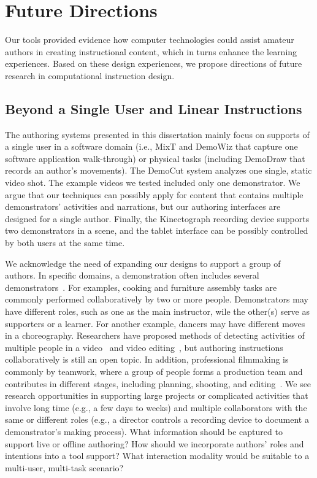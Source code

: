 \section{Future Directions} %

Our tools provided evidence how computer technologies could assist amateur authors in creating instructional content, which in turns enhance the learning experiences. Based on these design experiences, we propose directions of future research in computational instruction design.

\subsection{Beyond a Single User and Linear Instructions}
The authoring systems presented in this dissertation mainly focus on supports of a single user in a software domain (i.e., MixT and DemoWiz that capture one software application walk-through) or physical tasks (including DemoDraw that records an author's movements).
%
The DemoCut system analyzes one single, static video shot. The example videos we tested included only one demonstrator. We argue that our techniques can possibly apply for content that contains multiple demonstrators' activities and narrations, but our authoring interfaces are designed for a single author.
%
Finally, the Kinectograph recording device supports two demonstrators in a scene, and the tablet interface can be possibly controlled by both users at the same time.

We acknowledge the need of expanding our designs to support a group of authors. In specific domains, a demonstration often includes several demonstrators~. For examples, cooking and furniture assembly tasks are commonly performed collaboratively by two or more people. Demonstrators may have different roles, such as one as the main instructor, wile the other(s) serve as supporters or a learner. For another example, dancers may have different moves in a choreography.
%
Researchers have proposed methods of detecting activities of multiple people in a video~ and video editing~\cite{PatelUIST16}, but authoring instructions collaboratively is still an open topic.
%
In addition, professional filmmaking is commonly by teamwork, where a group of people forms a production team and contributes in different stages, including planning, shooting, and editing~. We see research opportunities in supporting large projects or complicated activities that involve long time (e.g., a few days to weeks) and multiple collaborators with the same or different roles (e.g., a director controls a recording device to document a demonstrator's making process).
What information should be captured to support live or offline authoring? How should we incorporate authors' roles and intentions into a tool support? What interaction modality would be suitable to a multi-user, multi-task scenario?

